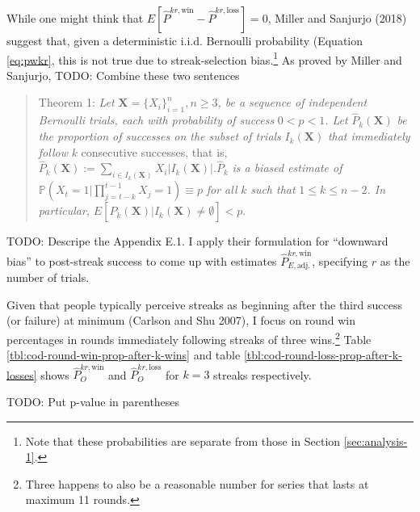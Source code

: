 \documentclass{article}
\begin{document}
While one might think that
\(E[\hat{P}^{kr,\text{win}} - \hat{P}^{kr,\text{loss}}] = 0\), Miller
and Sanjurjo (2018) suggest that, given a deterministic i.i.d. Bernoulli
probability (Equation \ref{eq:pwkr}, this is not true due to
streak-selection bias.\footnote{Note that these probabilities are
  separate from those in Section \ref{sec:analysis-1}.} As proved by
Miller and Sanjurjo, TODO: Combine these two sentences

\begin{quote}
Theorem 1: \emph{Let}
\(\mathbf{X} = \{X_i\}^{n}_{i=1}, n \geq 3\)\emph{, be a sequence of
independent Bernoulli trials, each with probability of success}
\(0 < p < 1\)\emph{. Let} \(\hat{P}_k(\mathbf{X})\) \emph{be the
proportion of successes on the subset of trials} \(I_k(\mathbf{X})\)
\emph{that immediately follow} \(k\) consecutive successes, that is,
\(\hat{P}_k(\mathbf{X}) := \sum_{i \in I_k(\mathbf{X})} X_i | I_k(\mathbf{X}) |. \hat{P}_k\)
\emph{is a biased estimate of}
\(\mathbb{P}(X_t = 1 | \prod_{j=t-k}^{t-1} X_j = 1) \equiv p\) \emph{for
all} \(k\) \emph{such that} \(1 \leq k \leq n - 2\)\emph{. In
particular,}
\(E[\hat{P}_k(\mathbf{X}) | I_k(\mathbf{X}) \neq \emptyset] < p.\)
\end{quote}

TODO: Descripe the Appendix E.1. I apply their formulation for
``downward bias'' to post-streak success to come up with estimates
\(\hat{P}^{kr,\text{win}}_{E,\text{adj.}}\), specifying \(r\) as the
number of trials.

Given that people typically perceive streaks as beginning after the
third success (or failure) at minimum (Carlson and Shu 2007), I focus on
round win percentages in rounds immediately following streaks of three
wins.\footnote{Three happens to also be a reasonable number for series
  that lasts at maximum 11 rounds.} Table
\ref{tbl:cod-round-win-prop-after-k-wins} and table
\ref{tbl:cod-round-loss-prop-after-k-losses} shows
\(\hat{P}^{kr,\text{win}}_O\) and \(\hat{P}^{kr,\text{loss}}_O\) for
\(k = 3\) streaks respectively.

TODO: Put p-value in parentheses
\end{document}
